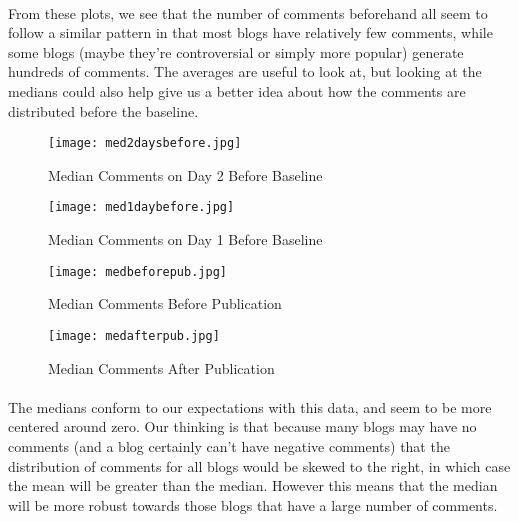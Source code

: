 \documentclass[paper=a4, fontsize=11pt]{scrartcl} %
\numberwithin{equation}{section} %
\numberwithin{figure}{section} %
\numberwithin{table}{section} %
\begin{document}
\paragraph{}
From these plots, we see that the number of comments beforehand all seem to follow a similar pattern in that most blogs have relatively few comments, while some blogs (maybe they're controversial or simply more popular) generate hundreds of comments. The averages are useful to look at, but looking at the medians could also help give us a better idea about how the comments are distributed before the baseline. 
 
 
 \begin{figure}[H]
    \centering
    \begin{minipage}{0.45\textwidth}
        \centering
        \texttt{[image: med2daysbefore.jpg]}
        \caption{Median Comments on Day 2 Before Baseline}
    \end{minipage}\hfill
    \begin{minipage}{0.45\textwidth}
        \centering
        \texttt{[image: med1daybefore.jpg]}
        \caption{Median Comments on Day 1 Before Baseline}
    \end{minipage}
\end{figure}

\begin{figure}[H]
    \centering
    \begin{minipage}{0.45\textwidth}
        \centering
        \texttt{[image: medbeforepub.jpg]} 
        \caption{Median Comments Before Publication}
    \end{minipage}\hfill
    \begin{minipage}{0.45\textwidth}
        \centering
        \texttt{[image: medafterpub.jpg]} 
        \caption{Median Comments After Publication}
    \end{minipage}
\end{figure}

\paragraph{}
 The medians conform to our expectations with this data, and seem to be more centered around zero. Our thinking is that because many blogs may have no comments (and a blog certainly can't have negative comments) that the distribution of comments for all blogs would be skewed to the right, in which case the mean will be greater than the median. However this means that the median will be more robust towards those blogs that have a large number of comments.
 
\end{document}
